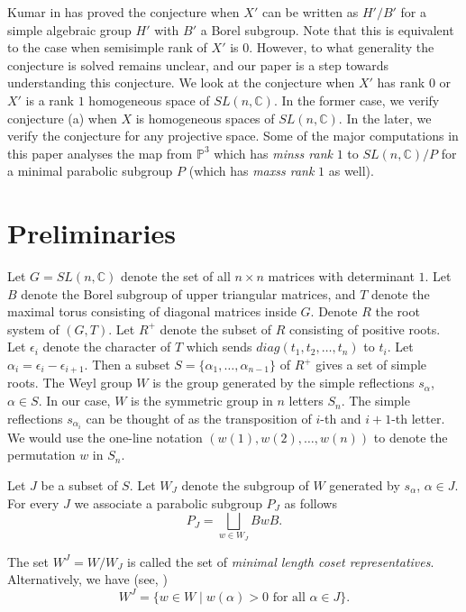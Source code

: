 \documentclass[a4paper,11pt]{amsart}
\newcommand{\C}{\mathbb{C}}
\begin{document}
Kumar in \cite{kumarsconj} has proved the conjecture when $X'$ can be written as $H'/B'$ for a simple algebraic group $H'$ with $B'$ a Borel subgroup. Note that this is equivalent to the case when semisimple rank of $X'$ is $0$. However, to what generality the conjecture is solved remains unclear, and our paper is a step towards understanding this conjecture. We look at the conjecture when $X'$ has rank $0$ or $X'$ is a rank $1$ homogeneous space of $SL(n,\mathbb{C})$. In the former case, we verify conjecture (a) when $X$ is homogeneous spaces of $SL(n,\mathbb{C})$. In the later, we verify the conjecture for any projective space. Some of the major computations in this paper analyses the map from $\mathbb{P}^3$ which has {\em minss rank} $1$ to $SL(n,\mathbb{C})/P$ for a minimal parabolic subgroup $P$ (which has {\em maxss rank} $1$ as well).

\section{Preliminaries}
Let $G = SL(n,\C)$ denote the set of all $n\times n$ matrices with determinant $1$. Let $B$ denote the Borel subgroup of upper triangular matrices, and $T$ denote the maximal torus consisting of diagonal matrices inside $G$. Denote $R$ the root system of $(G,T)$. Let $R^+$ denote the subset of $R$ consisting of positive roots. Let $\epsilon_i$ denote the character of $T$ which sends $diag(t_1,t_2,\ldots, t_n)$ to $t_i$. Let $\alpha_i = \epsilon_i - \epsilon_{i+1}$. Then a subset $S= \{\alpha_1, \ldots, \alpha_{n-1} \}$ of $R^+$ gives a set of simple roots. The Weyl group $W$ is the group generated by the simple reflections $s_{\alpha}$, $\alpha \in S$. In our case, $W$ is the symmetric group in $n$ letters $S_n$. The simple reflections $s_{\alpha_i}$ can be thought of as the transposition of $i$-th and $i+1$-th letter. We would use the one-line notation $(w(1),w(2),\ldots,w(n))$ to denote the permutation $w$ in $S_n$. 

Let $J$ be a subset of $S$. Let $W_J$ denote the subgroup of $W$ generated by $s_{\alpha}$, $\alpha \in J$. For every $J$ we associate a parabolic subgroup $P_J$ as follows 
\[ P_J = \bigsqcup_{w \in W_J} BwB.  \]

The set $W^J = W/W_J$ is called the set of {\em minimal length coset representatives}. Alternatively, we have (see, \cite[Section 2.5]{Billeylakshmibai}) 
\[ W^J = \{ w\in W \mid w(\alpha) > 0 \text{ for all } \alpha \in J \}.
\] 
\end{document}
